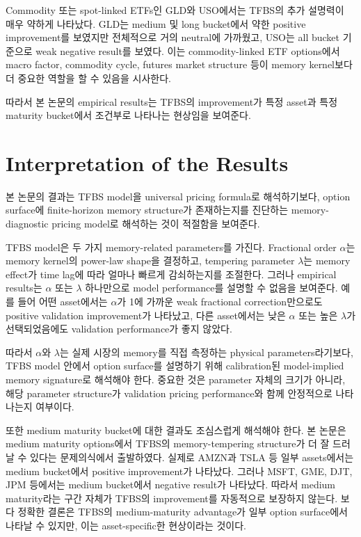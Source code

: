 \documentclass[11pt,a4paper]{report}
\begin{document}
Commodity 또는 spot-linked ETFs인 GLD와 USO에서는 TFBS의 추가 설명력이 매우 약하게 나타났다. GLD는 medium 및 long bucket에서 약한 positive improvement를 보였지만 전체적으로 거의 neutral에 가까웠고, USO는 all bucket 기준으로 weak negative result를 보였다. 이는 commodity-linked ETF options에서 macro factor, commodity cycle, futures market structure 등이 memory kernel보다 더 중요한 역할을 할 수 있음을 시사한다.

따라서 본 논문의 empirical results는 TFBS의 improvement가 특정 asset과 특정 maturity bucket에서 조건부로 나타나는 현상임을 보여준다.

\section{Interpretation of the Results}

본 논문의 결과는 TFBS model을 universal pricing formula로 해석하기보다, option surface에 finite-horizon memory structure가 존재하는지를 진단하는 memory-diagnostic pricing model로 해석하는 것이 적절함을 보여준다.

TFBS model은 두 가지 memory-related parameters를 가진다. Fractional order \(\alpha\)는 memory kernel의 power-law shape을 결정하고, tempering parameter \(\lambda\)는 memory effect가 time lag에 따라 얼마나 빠르게 감쇠하는지를 조절한다. 그러나 empirical results는 \(\alpha\) 또는 \(\lambda\) 하나만으로 model performance를 설명할 수 없음을 보여준다. 예를 들어 어떤 asset에서는 \(\alpha\)가 1에 가까운 weak fractional correction만으로도 positive validation improvement가 나타났고, 다른 asset에서는 낮은 \(\alpha\) 또는 높은 \(\lambda\)가 선택되었음에도 validation performance가 좋지 않았다.

따라서 \(\alpha\)와 \(\lambda\)는 실제 시장의 memory를 직접 측정하는 physical parameters라기보다, TFBS model 안에서 option surface를 설명하기 위해 calibration된 model-implied memory signature로 해석해야 한다. 중요한 것은 parameter 자체의 크기가 아니라, 해당 parameter structure가 validation pricing performance와 함께 안정적으로 나타나는지 여부이다.

또한 medium maturity bucket에 대한 결과도 조심스럽게 해석해야 한다. 본 논문은 medium maturity options에서 TFBS의 memory-tempering structure가 더 잘 드러날 수 있다는 문제의식에서 출발하였다. 실제로 AMZN과 TSLA 등 일부 assets에서는 medium bucket에서 positive improvement가 나타났다. 그러나 MSFT, GME, DJT, JPM 등에서는 medium bucket에서 negative result가 나타났다. 따라서 medium maturity라는 구간 자체가 TFBS의 improvement를 자동적으로 보장하지 않는다. 보다 정확한 결론은 TFBS의 medium-maturity advantage가 일부 option surface에서 나타날 수 있지만, 이는 asset-specific한 현상이라는 것이다.
\end{document}
